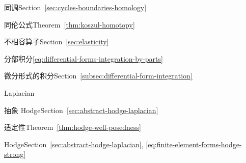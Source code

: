 \par\noindent\hspace*{0em}\label{index:homology}{同调}\quad Section~\ref{sec:cycles-boundaries-homology}

\par\noindent\hspace*{0em}\label{index:homotopy-formula}{同伦公式}\quad Theorem~\ref{thm:koszul-homotopy}

\par\noindent\hspace*{0em}\label{index:incompatibility-operator}{不相容算子}\quad Section~\ref{sec:elasticity}

\par\noindent\hspace*{0em}\label{index:integration-by-parts}{分部积分}\quad \eqref{eq:differential-forms-integration-by-parts}

\par\noindent\hspace*{0em}\label{index:integration-of-differential-forms}{微分形式的积分}\quad Section~\ref{subsec:differential-form-integration}

\par\noindent\hspace*{0em}\label{index:laplacian}{Laplacian}

\par\noindent\hspace*{1em}\label{index:laplacian-abstract-hodge}{抽象 Hodge}\quad Section~\ref{sec:abstract-hodge-laplacian}

\par\noindent\hspace*{2em}\label{index:laplacian-abstract-hodge-well-posedness-of}{适定性}\quad Theorem~\ref{thm:hodge-well-posedness}

\par\noindent\hspace*{1em}\label{index:laplacian-hodge}{Hodge}\quad Section~\ref{sec:abstract-hodge-laplacian}, \eqref{eq:finite-element-forms-hodge-strong}

